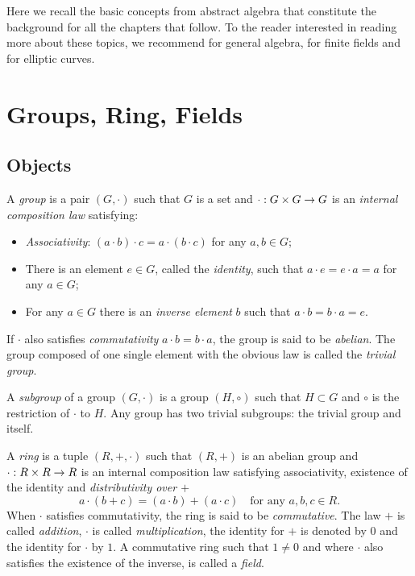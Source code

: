 Here we recall the basic concepts from abstract algebra that
constitute the background for all the chapters that follow. To the
reader interested in reading more about these topics, we recommend
\cite{lang} for general algebra, \cite{lidl+niederreiter:2} for finite
fields and \cite{silverman:elliptic,silverman:advanced} for elliptic
curves.

\section{Groups, Ring, Fields}
\label{sec:ring-fields}

\subsection{Objects}
\label{sec:ring-fields:objects}

A \emph{group} is a pair $(G,\cdot)$ such that $G$ is a
set and $\cdot:G\times G\rightarrow G$ is an \emph{internal composition law}
satisfying:
\begin{itemize}
\item \emph{Associativity}: $(a\cdot b)\cdot c =
  a \cdot (b\cdot c)$ for any $a,b\in G$;
\item There is an element $e\in G$, called the \emph{identity}, such that $a\cdot e = e\cdot a = a$ for any
  $a\in G$;
\item For any $a\in G$ there is an \emph{inverse element} $b$ such that $a\cdot b = b\cdot a =
  e$.
\end{itemize}
If $\cdot$ also satisfies \emph{commutativity}
$a\cdot b=b\cdot a$, the group is said to be
\emph{abelian}. The group composed of one single
element with the obvious law is called the
\emph{trivial group}.

A \emph{subgroup} of a group $(G,\cdot)$ is a group
$(H,\circ)$ such that $H\subset G$ and $\circ$ is the restriction of
$\cdot$ to $H$. Any group has two trivial subgroups: the trivial group
and itself.

A \emph{ring} is a tuple $(R,+,\cdot)$ such that $(R,+)$
is an abelian group and $\cdot:R\times R\rightarrow R$ is an internal
composition law satisfying associativity, existence of the identity
and \emph{distributivity over $+$}
\[a \cdot (b + c) = (a\cdot b) + (a\cdot c) \quad\text{for any
  $a,b,c\in R$.}\] When $\cdot$ satisfies commutativity, the ring is
said to be \emph{commutative}.  The law $+$ is
called \emph{addition}, $\cdot$ is called \emph{multiplication}, the
identity for $+$ is denoted by $0$ and the identity for $\cdot$ by
$1$.  A commutative ring such that $1\ne 0$ and where $\cdot$ also
satisfies the existence of the inverse, is called a
\emph{field}.

